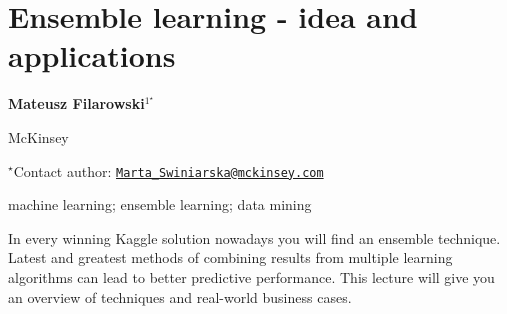 \documentclass[\main/boa.tex]{subfiles}
\begin{document}
\section{Ensemble learning - idea and applications}

\begin{center}
  {\bf {} Mateusz Filarowski$^{1^\star}$}
\end{center}

\vskip 0.3cm

\begin{affiliations}
\begin{enumerate}
\begin{minipage}{0.915\textwidth}
\centering
\item McKinsey \\[-2pt]
\end{minipage}
\end{enumerate}
$^\star$Contact author: \href{mailto:Marta_Swiniarska@mckinsey.com}{\nolinkurl{Marta\_Swiniarska@mckinsey.com}}\\
\end{affiliations}

\vskip 0.5cm

\begin{minipage}{0.915\textwidth}
\keywords machine learning; ensemble learning; data mining
\packages {}
\end{minipage}

\vskip 0.8cm

In every winning Kaggle solution nowadays you will find an ensemble
technique. Latest and greatest methods of combining results from
multiple learning algorithms can lead to better predictive performance.
This lecture will give you an overview of techniques and real-world
business cases.
\end{document}
